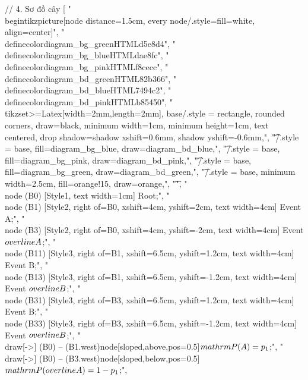 // 4. Sơ đồ cây
[
"\\begin{tikzpicture}[node distance=1.5cm, every node/.style={fill=white}, align=center]",
"\t\\definecolor{diagram_bg_green}{HTML}{d5e8d4}",
"\t\\definecolor{diagram_bg_blue}{HTML}{dae8fc}",
"\t\\definecolor{diagram_bg_pink}{HTML}{f8cecc}",
"\t\\definecolor{diagram_bd_green}{HTML}{82b366}",
"\t\\definecolor{diagram_bd_blue}{HTML}{7494c2}",
"\t\\definecolor{diagram_bd_pink}{HTML}{b85450}",
"\t\\tikzset{>={Latex[width=2mm,length=2mm]}, base/.style = {rectangle, rounded corners, draw=black, minimum width=1cm, minimum height=1cm, text centered, drop shadow={shadow xshift=0.6mm, shadow yshift=-0.6mm}},",
	"\t{}/.style = {base, fill=diagram_bg_blue, draw=diagram_bd_blue},",
	"\t{}/.style = {base, fill=diagram_bg_pink, draw=diagram_bd_pink},",
	"\t{}/.style = {base, fill=diagram_bg_green, draw=diagram_bd_green},",
	"\t{}/.style = {base, minimum width=2.5cm, fill=orange!15, draw=orange},",
	"\t}",
"\t\\node (B0) [Style1, text width=1cm] {Root};",
"\t\\node (B1) [Style2, right of=B0, xshift=4cm, yshift=2cm, text width=4cm] {Event A};",
"\t\\node (B3) [Style2, right of=B0, xshift=4cm, yshift=-2cm, text width=4cm] {Event $\\overline{A}$};",
"\t\\node (B11) [Style3, right of=B1, xshift=6.5cm, yshift=1.2cm, text width=4cm] {Event B};",
"\t\\node (B13) [Style3, right of=B1, xshift=6.5cm, yshift=-1.2cm, text width=4cm] {Event $\\overline{B}$};",
"\t\\node (B31) [Style3, right of=B3, xshift=6.5cm, yshift=1.2cm, text width=4cm] {Event B};",
"\t\\node (B33) [Style3, right of=B3, xshift=6.5cm, yshift=-1.2cm, text width=4cm] {Event $\\overline{B}$};",
"\t\\draw[->] (B0) -- (B1.west)node[sloped,above,pos=0.5]{$\\mathrm{P}(A)=p_1$};",
"\t\\draw[->] (B0) -- (B3.west)node[sloped,below,pos=0.5]{$\\mathrm{P}(\\overline{A})=1-p_1$};",
